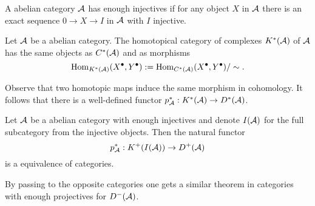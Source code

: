 \begin{definition}
 A abelian category $\AA$ has enough injectives if for any object $X$ in $\AA$ there is an exact sequence $0\to X \to I$ in $\AA$ with $I$ injective.
\end{definition}
\begin{definition}
 Let $\AA$ be a abelian category.
 The homotopical category of complexes $K^*(\AA)$ of $\AA$ has the same objects as $C^*(\AA)$ and as morphisms
 $$\operatorname{Hom}_{K^*(\AA)}(X^\bullet,Y^\bullet):= \operatorname{Hom}_{C^*(\AA)}(X^\bullet,Y^\bullet)/\sim.$$
\end{definition}
Observe that two homotopic maps induce the same morphism in cohomology.
It follows that there is a well-defined functor $p_\AA^*:K^*(\AA)\to D^*(\AA)$.
\begin{proposition}\label{prop: DerivedCategoryInjectives}
 Let $\AA$ be a abelian category with enough injectives and denote $I(\AA)$ for the full subcategory from the injective objects.
 Then the natural functor
 $$p_\AA^*: K^+(I(\AA))\to D^+(\AA) $$
 is a equivalence of categories.
\end{proposition}
By passing to the opposite categories one gets a similar theorem in categories with enough projectives for $D^-(\AA)$.
